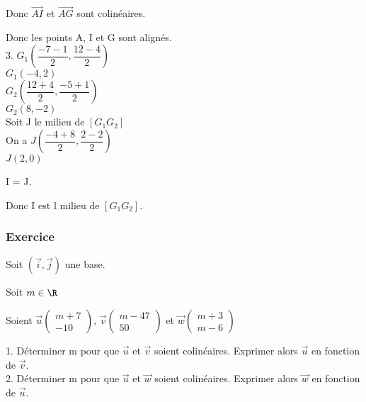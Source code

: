 Donc $\overrightarrow{AI}$ et $\overrightarrow{AG}$ sont colinéaires.

Donc les points A, I et G sont alignés.\\

3. $G_1 \left(\dfrac{-7 - 1}{2} , \dfrac{12-4}{2}\right)$\\

$ G_1 \left(-4, 2\right) $\\

$ G_2 \left(\dfrac{12 + 4}{2} , \dfrac{-5 + 1}{2} \right) $\\

$ G_2\left(8,-2\right) $\\

Soit J le milieu de $\left[G_1G_2\right]$\\

On a $J\left(\dfrac{-4 + 8}{2}, \dfrac{2-2}{2} \right)$\\

$J\left(2,0\right)$  

I = J.

Donc I est l milieu de $\left[G_1G_2\right]$.
\newpage

\subsubsection{Exercice }

Soit $\left(\vec{i}, \vec{j}\right)$ une base.

Soit $m \in \R$

Soient $\vec{u}\left(\begin{array}{c} m+7\\ -10 \end{array}\right)$, $\vec{v}\left(\begin{array}{c} m-47\\ 50 \end{array}\right)$ et $\overrightarrow{w}\left(\begin{array}{c} m+3\\ m-6 \end{array}\right)$

1. Déterminer m pour que $\vec{u}$ et $\vec{v}$ soient colinéaires. Exprimer alors $\vec{u}$ en fonction de $\vec{v}$.\\

2. Déterminer m pour que $\vec{u}$ et $\overrightarrow{w}$ soient colinéaires. Exprimer alors $\overrightarrow{w}$ en fonction de $\vec{u}$.\\



